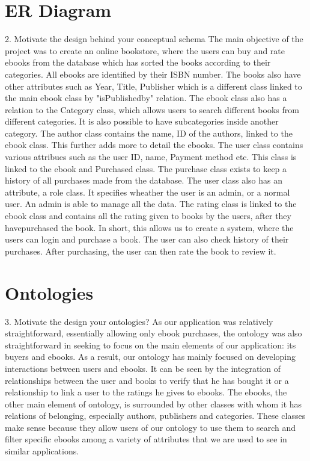 \documentclass[a4paper,12pt]{article}
\begin{document}
\section{ER Diagram}
2. Motivate the design behind your conceptual schema
The main objective of the project was to create an online bookstore, where the users can buy and rate ebooks from the database which has sorted the books according to their categories.
All ebooks are identified by their ISBN number. The books also have other attributes such as Year, Title, Publisher which is a different class linked to the main ebook class by "isPublishedby" relation. The ebook class also has a relation to the Category class, which allows users to search different books from different categories. It is also possible to have subcategories inside another category. The author class contains the name, ID of the authors, linked to the ebook class. This further adds more to detail the ebooks.
The user class contains various attribues such as the user ID, name, Payment method etc. This class is linked to the ebook and Purchased class. The purchase class exists to keep a history of all purchases made from the database. The user class also has an attribute, a role class. It specifies wheather the user is an admin, or a normal user. An admin is able to manage all the data. 
The rating class is linked to the ebook class and contains all the rating given to books by the users, after they havepurchased the book.
In short, this allows us to create a system, where the users can login and purchase a book. The user can also check history of their purchases. After purchasing, the user can then rate the book to review it.

\section{Ontologies}
3. Motivate the design your ontologies? 
As our application was relatively straightforward, essentially allowing only ebook purchases, the ontology was also straightforward in seeking to focus on the main elements of our application: its buyers and ebooks. As a result, our ontology has mainly focused on developing interactions between users and ebooks. It can be seen by the integration of relationships between the user and books to verify that he has bought it or a relationship to link a user to the ratings he gives to ebooks. The ebooks, the other main element of ontology, is surrounded by other classes with whom it has relations of belonging, especially authors, publishers and categories. These classes make sense because they allow users of our ontology to use them to search and filter specific ebooks among a variety of attributes that we are used to see in similar applications.
\end{document}
